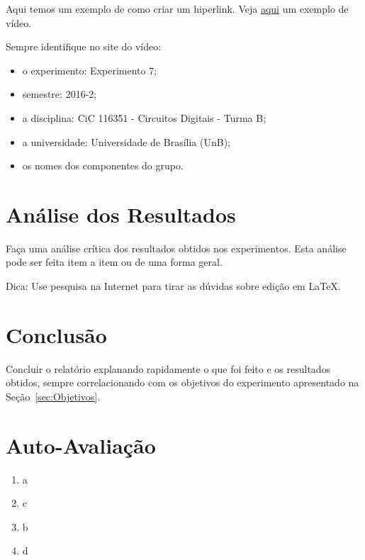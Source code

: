 \documentclass[12pt]{article}
\begin{document}
Aqui temos um exemplo de como criar um hiperlink. Veja
\href{https://www.youtube.com/watch?v=EcNxjxKRQ6E}{aqui} um exemplo de vídeo.

Sempre identifique no site do vídeo:
\begin{itemize}
    \item o experimento: Experimento 7;
    \item semestre: 2016-2;
    \item a disciplina: CiC 116351 - Circuitos Digitais - Turma B;
    \item a universidade: Universidade de Brasília (UnB);
    \item os nomes dos componentes do grupo.
\end{itemize}

\section{Análise dos Resultados}
\label{sec:Resultados}

Faça uma análise crítica dos resultados obtidos nos experimentos. Esta análise pode ser feita item a item ou de uma forma geral.

Dica: Use pesquisa na Internet para tirar as dúvidas sobre edição em \LaTeX .

\section{Conclusão}
\label{sec:Conclusao}

Concluir o relatório explanando rapidamente o que foi feito e os resultados obtidos, sempre correlacionando com os objetivos do experimento apresentado na Seção~\ref{sec:Objetivos}. 






\newpage 
\section*{Auto-Avaliação}

\begin{enumerate}
    \item a
    \item c
    \item b
    \item d
\end{enumerate}
\end{document}
